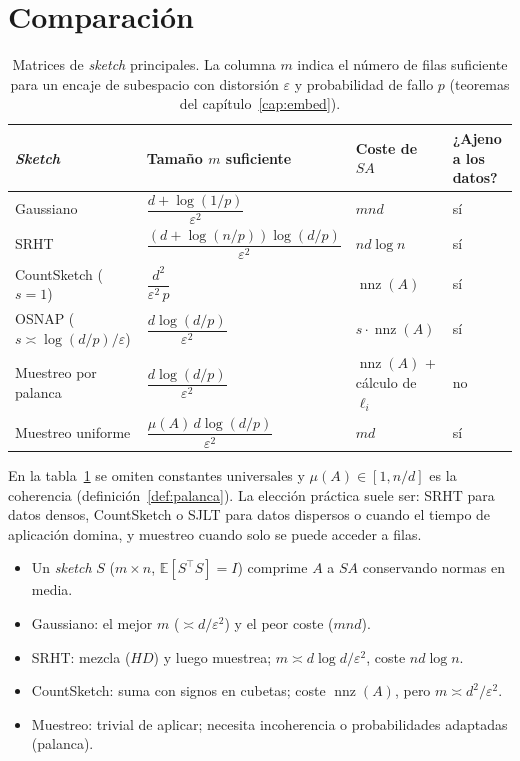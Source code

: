 \documentclass[11pt,a4paper,oneside]{book}
\theoremstyle{definition}
\theoremstyle{remark}
\newcommand{\E}{\mathbb{E}}
\newcommand{\T}{^{\top}}
\newcommand{\eps}{\varepsilon}
\DeclareMathOperator{\nnz}{nnz}
\begin{document}
\section{Comparación}

\begin{table}[ht]
\centering\small
\caption{Matrices de \emph{sketch} principales. La columna $m$ indica el número de filas suficiente para un
encaje de subespacio con distorsión $\eps$ y probabilidad de fallo $p$ (teoremas del capítulo~\ref{cap:embed}).}
\label{tab:sketches}
\begin{tabular}{@{}llll@{}}
\toprule
\emph{Sketch} & Tamaño $m$ suficiente & Coste de $SA$ & ¿Ajeno a los datos? \\
\midrule
Gaussiano & $\dfrac{d+\log(1/p)}{\eps^2}$ & $mnd$ & sí \\[8pt]
SRHT & $\dfrac{(d+\log(n/p))\log(d/p)}{\eps^2}$ & $nd\log n$ & sí \\[8pt]
CountSketch ($s=1$) & $\dfrac{d^2}{\eps^2\,p}$ & $\nnz(A)$ & sí \\[8pt]
OSNAP ($s\asymp\log(d/p)/\eps$) & $\dfrac{d\log(d/p)}{\eps^2}$ & $s\cdot\nnz(A)$ & sí \\[8pt]
Muestreo por palanca & $\dfrac{d\log(d/p)}{\eps^2}$ & $\nnz(A)$ + cálculo de $\ell_i$ & no \\[8pt]
Muestreo uniforme & $\dfrac{\mu(A)\,d\log(d/p)}{\eps^2}$ & $md$ & sí \\
\bottomrule
\end{tabular}
\end{table}

En la tabla~\ref{tab:sketches} se omiten constantes universales y $\mu(A)\in[1,n/d]$ es la coherencia
(definición~\ref{def:palanca}). La elección práctica suele ser: SRHT para datos densos, CountSketch o SJLT
para datos dispersos o cuando el tiempo de aplicación domina, y muestreo cuando solo se puede acceder a filas.

\begin{resumen}
\begin{itemize}
  \item Un \emph{sketch} $S$ ($m\times n$, $\E[S\T S]=I$) comprime $A$ a $SA$ conservando normas en media.
  \item Gaussiano: el mejor $m$ ($\asymp d/\eps^2$) y el peor coste ($mnd$).
  \item SRHT: mezcla ($HD$) y luego muestrea; $m\asymp d\log d/\eps^2$, coste $nd\log n$.
  \item CountSketch: suma con signos en cubetas; coste $\nnz(A)$, pero $m\asymp d^2/\eps^2$.
  \item Muestreo: trivial de aplicar; necesita incoherencia o probabilidades adaptadas (palanca).
\end{itemize}
\end{resumen}
\end{document}
